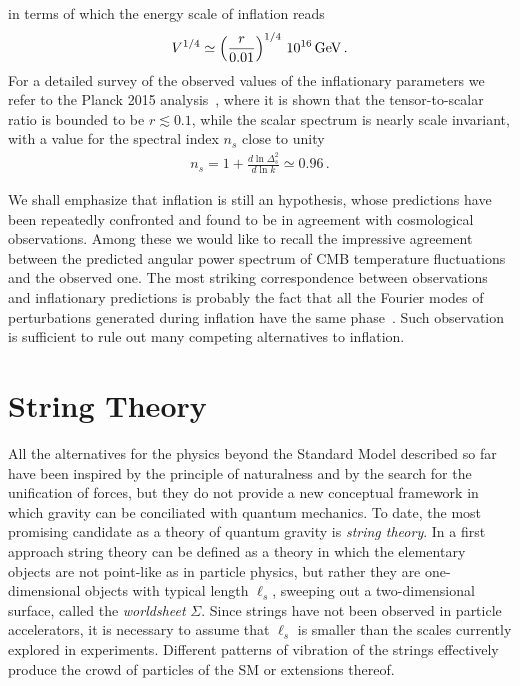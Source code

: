 \documentclass[12pt,a4paper]{book}
\begin{document}
in terms of which the energy scale of inflation reads
\begin{align}
\label{eq:EnergyScaleInflation}
V^{1/4} \simeq \left(\frac{r}{0.01}\right)^{1/4} \, 10^{16} \, \rm GeV \,.
\end{align}
For a detailed survey of the observed values of the inflationary parameters we refer to the Planck 2015 analysis~\cite{Ade:2015lrj}, where it is shown that the tensor-to-scalar ratio is bounded to be $r \lesssim 0.1$, while the scalar spectrum is nearly scale invariant, with a value for the spectral index $n_s$ close to unity
\begin{align}
n_s = 1 + \frac{d \ln \Delta_s^2}{d \ln k} \simeq 0.96\,.
\end{align}

We shall emphasize that inflation is still an hypothesis, whose predictions have been repeatedly confronted and found to be in agreement with cosmological observations. Among these we would like to recall the impressive agreement between the predicted angular power spectrum of CMB temperature fluctuations and the observed one. The most striking correspondence between observations and inflationary predictions is probably the fact that all the Fourier modes of perturbations generated during inflation have the same phase~\cite{Dodelson:2003ft, Baumann:2009ds}. Such observation is sufficient to rule out many competing alternatives to inflation.

\section{String Theory}
\label{sec:StringTheory}

All the alternatives for the physics beyond the Standard Model described so far have been inspired by the principle of naturalness and by the search for the unification of forces, but they do not provide a new conceptual framework in which gravity can be conciliated with quantum mechanics. To date, the most promising candidate as a theory of quantum gravity is \textit{string theory}. In a first approach string theory can be defined as a theory in which the elementary objects are not point-like as in particle physics, but rather they are one-dimensional objects with typical length $\ell_s$, sweeping out a two-dimensional surface, called the \textit{worldsheet} $\Sigma$. Since strings have not been observed in particle accelerators, it is necessary to assume that $\ell_s$ is smaller than the scales currently explored in experiments. Different patterns of vibration of the strings effectively produce the crowd of particles of the SM or extensions thereof.\\
\end{document}
